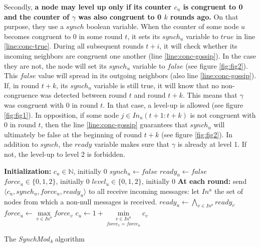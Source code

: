 \documentclass[11pt,letterpaper]{article}
\newcommand{\cent}{\gamma}
\newcommand{\SM}{{\em SynchMod}$_{\,k}\ $}
\begin{document}
Secondly, \textbf{a node may level up only if its counter $c_u$ is congruent to 0 and the counter of $\gamma$ was also congruent to 0 $k$ rounds ago.}
On that purpose, they use a $synch$ boolean variable.
When the counter of some node $u$ becomes congruent to 0 in some round $t$, it sets its $synch_u$ variable to $true$ in line \ref{line:conc-true}.
During all subsequent rounds $t+i$, it will check whether its incoming neighbors are congruent one another (line \ref{line:conc-gossip}).
In the case they are not, the node will set its $synch_u$ variable to $false$ (see figure \ref{fig:fig2}).
This $false$ value will spread in its outgoing neighbors (also line \ref{line:conc-gossip}).
If, in round $t+k$, its $synch_u$ variable is still true, it will know that no non-congruence was detected between round $t$ and round $t+k$.
This means that $\cent$ was congruent with 0 in round $t$.
In that case, a level-up is allowed (see figure \ref{fig:fig1}).
In opposition, if some node $j \in In_u(t+1:t+k)$ is not congruent with 0 in round $t$,
then the line \ref{line:conc-gossip} guarantees that $synch_u$ will ultimately be false at the beginning of round $t+k$ (see figure \ref{fig:fig2}).
In addition to $synch$, the $ready$ variable makes sure that $\cent$ is already at level 1.
If not, the level-up to level 2 is forbidden.


\begin{algorithm}[hbt!]
	\DontPrintSemicolon
	\textbf{Initialization:} \;
	\Indp
		$c_u \in \mathds{N}$, initially 0 \;
		$synch_u \leftarrow false$ \;
		$ready_u \leftarrow false$ \;
		$force_u \in \{0, 1, 2\}$, initially 0 \;
		$level_u \in \{0, 1, 2\}$, initially 0 \;
	\BlankLine
	\Indm
	\textbf{At each round:} \;
	\Indp
		send $\langle c_u, synch_u, force_u, ready_u \rangle$ to all  \;
		{\small receive incoming messages: let $In^a$ the set of nodes from which a non-null messages is received.} \;
		$ready_u \leftarrow \underset{v \in In^a}{\bigwedge} ready_v $ \; \label{line:ready-gossip} 
		$force_u \leftarrow \underset{v \in In^a}{\max} force_v$ \;\label{line:force}
		$c_u \leftarrow 1+ \underset{force_v = force_u}{\underset{v \in In^a}{\min}} c_v$ \;\label{line:min-z-end} 
	\Indm
\caption{The \SM algorithm} 
\end{algorithm}
\end{document}
